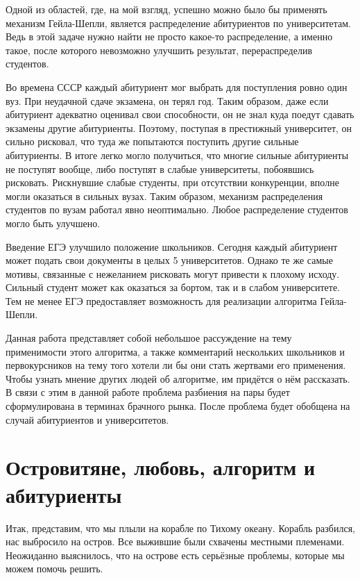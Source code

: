 \documentclass[pdftex, 11pt, a4paper]{article}
\begin{document}
Одной из областей, где, на мой взгляд, успешно можно было бы применять механизм Гейла-Шепли, является распределение абитуриентов по университетам. Ведь в этой задаче нужно найти не просто какое-то распределение,  а именно такое, после которого невозможно улучшить результат, перераспределив студентов. 

Во времена СССР каждый абитуриент мог выбрать для поступления ровно один вуз. При неудачной сдаче экзамена, он терял год. Таким образом, даже если абитуриент адекватно оценивал свои способности, он не знал куда поедут сдавать экзамены другие абитуриенты. Поэтому, поступая в престижный университет, он сильно рисковал, что туда же попытаются поступить другие сильные абитуриенты. В итоге легко могло получиться, что многие сильные абитуриенты не поступят вообще, либо поступят в слабые университеты, побоявшись рисковать. Рискнувшие слабые студенты, при отсутствии конкуренции, вполне могли оказаться в сильных вузах. Таким образом, механизм распределения студентов по вузам работал явно неоптимально. Любое распределение студентов могло быть улучшено.  

Введение ЕГЭ улучшило положение школьников. Сегодня каждый абитуриент может подать свои документы в целых 5 университетов. Однако те же самые мотивы, связанные с нежеланием рисковать могут привести к плохому исходу. Сильный студент может как оказаться за бортом, так и в слабом университете. Тем не менее ЕГЭ предоставляет возможность для реализации алгоритма Гейла-Шепли. 

Данная работа представляет собой небольшое рассуждение на тему применимости этого алгоритма, а также комментарий нескольких школьников и первокурсников на тему того хотели ли бы они стать жертвами его применения. Чтобы узнать мнение других людей об алгоритме, им придётся о нём рассказать. В связи с этим в данной работе проблема разбиения на пары будет сформулирована в терминах брачного рынка. После проблема будет обобщена на случай абитуриентов и университетов.  

\section{Островитяне, любовь, алгоритм и абитуриенты} 

Итак, представим, что мы плыли на корабле по Тихому океану. Корабль разбился, нас выбросило на остров. Все выжившие были схвачены местными племенами. Неожиданно выяснилось, что на острове есть серьёзные проблемы, которые мы можем помочь решить.  
\end{document}
